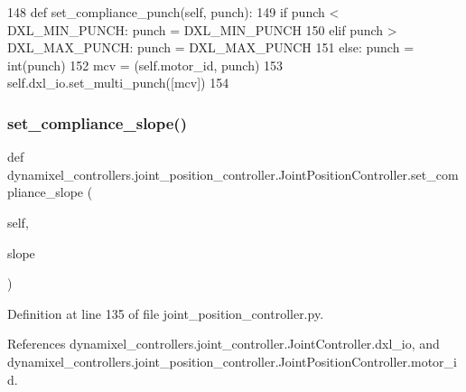 \begin{DoxyCode}
148     \textcolor{keyword}{def }set\_compliance\_punch(self, punch):
149         \textcolor{keywordflow}{if} punch < DXL\_MIN\_PUNCH: punch = DXL\_MIN\_PUNCH
150         \textcolor{keywordflow}{elif} punch > DXL\_MAX\_PUNCH: punch = DXL\_MAX\_PUNCH
151         \textcolor{keywordflow}{else}: punch = int(punch)
152         mcv = (self.motor\_id, punch)
153         self.dxl\_io.set\_multi\_punch([mcv])
154 
\end{DoxyCode}
\mbox{\label{classdynamixel__controllers_1_1joint__position__controller_1_1_joint_position_controller_aa802e87f5c3cd1b219f8342dc3f9e118}} 
\subsubsection{\texorpdfstring{set\+\_\+compliance\+\_\+slope()}{set\_compliance\_slope()}}
{\footnotesize\ttfamily def dynamixel\+\_\+controllers.\+joint\+\_\+position\+\_\+controller.\+Joint\+Position\+Controller.\+set\+\_\+compliance\+\_\+slope (\begin{DoxyParamCaption}\item[{}]{self,  }\item[{}]{slope }\end{DoxyParamCaption})}



Definition at line 135 of file joint\+\_\+position\+\_\+controller.\+py.



References dynamixel\+\_\+controllers.\+joint\+\_\+controller.\+Joint\+Controller.\+dxl\+\_\+io, and dynamixel\+\_\+controllers.\+joint\+\_\+position\+\_\+controller.\+Joint\+Position\+Controller.\+motor\+\_\+id.


